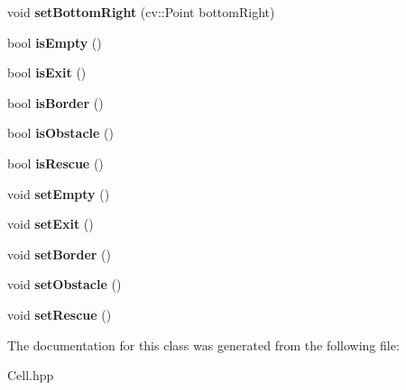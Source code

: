 \begin{DoxyCompactItemize}
void {\bfseries set\+Bottom\+Right} (cv\+::\+Point bottom\+Right)
\item 
\mbox{\label{class_cell_a6c7344ef2aa917e70364221bf86ff8bc}} 
bool {\bfseries is\+Empty} ()
\item 
\mbox{\label{class_cell_aaf13f5d308c7f1eb670a050e4fc6dc28}} 
bool {\bfseries is\+Exit} ()
\item 
\mbox{\label{class_cell_a34d62b7c65fd85f356bd9e2c3058edcb}} 
bool {\bfseries is\+Border} ()
\item 
\mbox{\label{class_cell_aee32093f779b1fa761b43a6b0a86ed6c}} 
bool {\bfseries is\+Obstacle} ()
\item 
\mbox{\label{class_cell_ad86a719c04ff04bdf79c1c0b8e5a5942}} 
bool {\bfseries is\+Rescue} ()
\item 
\mbox{\label{class_cell_a6047939b792e819bc2330151ff98864f}} 
void {\bfseries set\+Empty} ()
\item 
\mbox{\label{class_cell_a9fa0a3c17d798320c78bffe44411008e}} 
void {\bfseries set\+Exit} ()
\item 
\mbox{\label{class_cell_aa690e62809d36d512cd39ccda9cea293}} 
void {\bfseries set\+Border} ()
\item 
\mbox{\label{class_cell_a34e953e7f720c3382f0b13c2480cafd0}} 
void {\bfseries set\+Obstacle} ()
\item 
\mbox{\label{class_cell_a83ce387dded080c1cbd87edd4242f23c}} 
void {\bfseries set\+Rescue} ()
\end{DoxyCompactItemize}


The documentation for this class was generated from the following file\+:\begin{DoxyCompactItemize}
\item 
Cell.\+hpp\end{DoxyCompactItemize}
